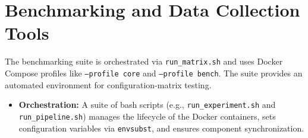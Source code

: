 \section{Benchmarking and Data Collection Tools}
\label{sec:benchmarking_tools}
The benchmarking suite is orchestrated via \texttt{run\_matrix.sh} and uses Docker Compose profiles like \texttt{--profile core} and \texttt{--profile bench}. The suite provides an automated environment for configuration-matrix testing.

\begin{itemize}
    \item \textbf{Orchestration:} A suite of bash scripts (e.g., \texttt{run\_experiment.sh} and \texttt{run\_pipeline.sh}) manages the lifecycle of the Docker containers, sets configuration variables via \texttt{envsubst}, and ensures component synchronization. 
\end{itemize}